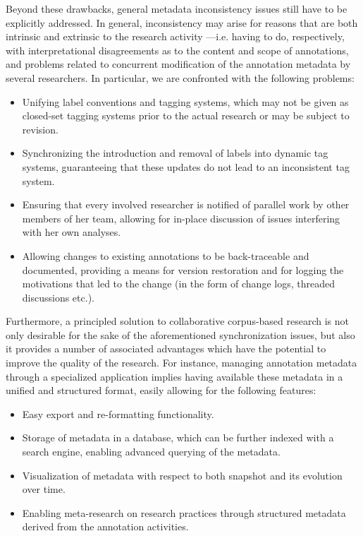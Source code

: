 \documentclass{sig-alternate}
\begin{document}
Beyond these drawbacks, general metadata inconsistency issues still have to be explicitly addressed.
In general, inconsistency may arise for reasons that are both intrinsic and extrinsic to the
research activity ---i.e. having to do, respectively, with interpretational disagreements
as to the content and scope of annotations, and problems related to concurrent modification of
the annotation metadata by several researchers. In particular, we are confronted with the
following problems:
\begin{itemize}
\item Unifying label conventions and tagging systems, which may not be given as closed-set
  tagging systems prior to the actual research or may be subject to revision.
\item Synchronizing the introduction and removal of labels into dynamic tag systems,
  guaranteeing that these updates do not lead to an inconsistent tag system.
\item Ensuring that every involved researcher is notified of parallel work by other members
  of her team, allowing for in-place discussion of issues interfering with her own analyses.
\item Allowing changes to existing annotations to be back-traceable and documented, providing
  a means for version restoration and for logging the motivations
  that led to the change (in the form of change logs, threaded discussions etc.).
\end{itemize}

Furthermore, a principled solution to collaborative corpus-based research is not only
desirable for the sake of the aforementioned synchronization issues, but also it provides
a number of associated advantages which have the potential to improve the quality of the research.
For instance, managing annotation metadata through a specialized application implies
having available these metadata in a unified and structured format, easily allowing
for the following features:

\begin{itemize}
\item Easy export and re-formatting functionality.
\item Storage of metadata in a database, which can be further indexed with a search engine,
  enabling advanced querying of the metadata.
\item Visualization of metadata with respect to both snapshot and its evolution over time.
\item Enabling meta-research on research practices through structured metadata derived
  from the annotation activities.
\end{itemize}
\end{document}
